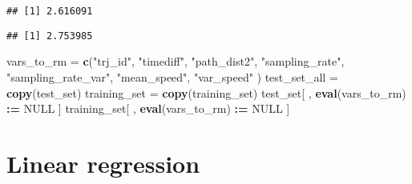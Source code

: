 \documentclass[]{article}
\newenvironment{Shaded}{\begin{snugshade}}{\end{snugshade}}
\newcommand{\DecValTok}[1]{\textcolor[rgb]{0.00,0.00,0.81}{#1}}
\newcommand{\ErrorTok}[1]{\textcolor[rgb]{0.64,0.00,0.00}{\textbf{#1}}}
\newcommand{\KeywordTok}[1]{\textcolor[rgb]{0.13,0.29,0.53}{\textbf{#1}}}
\newcommand{\NormalTok}[1]{#1}
\newcommand{\OperatorTok}[1]{\textcolor[rgb]{0.81,0.36,0.00}{\textbf{#1}}}
\newcommand{\OtherTok}[1]{\textcolor[rgb]{0.56,0.35,0.01}{#1}}
\newcommand{\StringTok}[1]{\textcolor[rgb]{0.31,0.60,0.02}{#1}}
\begin{document}
\begin{verbatim}
## [1] 2.616091
\end{verbatim}

\begin{Shaded}
\end{Shaded}

\begin{verbatim}
## [1] 2.753985
\end{verbatim}

\begin{Shaded}
\begin{Highlighting}[]
\NormalTok{vars_to_rm =}\StringTok{ }\KeywordTok{c}\NormalTok{(}\StringTok{"trj_id"}\NormalTok{, }\StringTok{"timediff"}\NormalTok{, }\StringTok{"path_dist2"}\NormalTok{, }\StringTok{"sampling_rate"}\NormalTok{,}
    \StringTok{"sampling_rate_var"}\NormalTok{, }\StringTok{"mean_speed"}\NormalTok{, }\StringTok{"var_speed"}\NormalTok{ )}
\NormalTok{test_set_all =}\StringTok{ }\KeywordTok{copy}\NormalTok{(test_set)}
\NormalTok{training_set =}\StringTok{ }\KeywordTok{copy}\NormalTok{(training_set)}
\NormalTok{test_set[ , }\KeywordTok{eval}\NormalTok{(vars_to_rm) }\OperatorTok{:}\ErrorTok{=}\StringTok{ }\OtherTok{NULL}\NormalTok{ ]}
\NormalTok{training_set[ , }\KeywordTok{eval}\NormalTok{(vars_to_rm) }\OperatorTok{:}\ErrorTok{=}\StringTok{ }\OtherTok{NULL}\NormalTok{ ]}
\end{Highlighting}
\end{Shaded}

\hypertarget{linear-regression}{%
\section{Linear regression}\label{linear-regression}}
\end{document}
